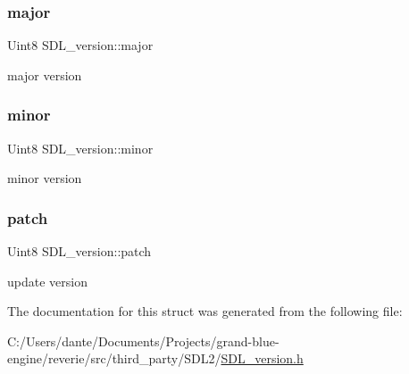 \subsubsection{\texorpdfstring{major}{major}}
{\footnotesize\ttfamily Uint8 S\+D\+L\+\_\+version\+::major}

major version \mbox{\label{struct_s_d_l__version_a6c35c7bf80245028d5970e6a504ecf57}} 
\subsubsection{\texorpdfstring{minor}{minor}}
{\footnotesize\ttfamily Uint8 S\+D\+L\+\_\+version\+::minor}

minor version \mbox{\label{struct_s_d_l__version_aa6dacff18edee8cd037c773b843be0f1}} 
\subsubsection{\texorpdfstring{patch}{patch}}
{\footnotesize\ttfamily Uint8 S\+D\+L\+\_\+version\+::patch}

update version 

The documentation for this struct was generated from the following file\+:\begin{DoxyCompactItemize}
\item 
C\+:/\+Users/dante/\+Documents/\+Projects/grand-\/blue-\/engine/reverie/src/third\+\_\+party/\+S\+D\+L2/\mbox{\hyperlink{_s_d_l__version_8h}{S\+D\+L\+\_\+version.\+h}}\end{DoxyCompactItemize}
